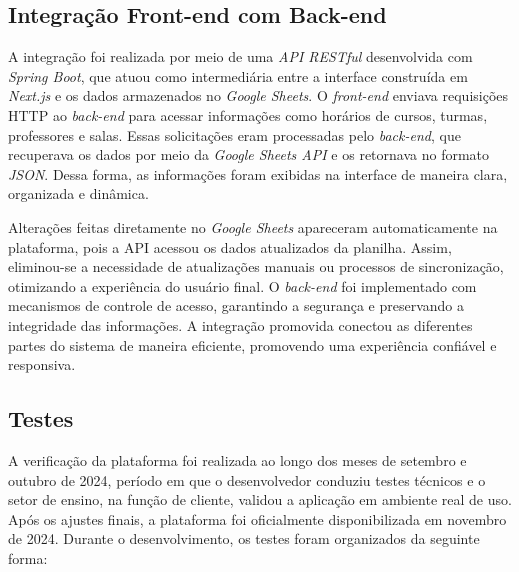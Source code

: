\subsection{Integração Front-end com Back-end}

A integração foi realizada por meio de uma \textit{API RESTful} desenvolvida com \textit{Spring Boot}, que atuou como intermediária entre a interface construída em \textit{Next.js} e os dados armazenados no \textit{Google Sheets}. O \textit{front-end} enviava requisições HTTP ao \textit{back-end} para acessar informações como horários de cursos, turmas, professores e salas. Essas solicitações eram processadas pelo \textit{back-end}, que recuperava os dados por meio da \textit{Google Sheets API} e os retornava no formato \textit{JSON}. Dessa forma, as informações foram exibidas na interface de maneira clara, organizada e dinâmica.

Alterações feitas diretamente no \textit{Google Sheets} apareceram automaticamente na plataforma, pois a API acessou os dados atualizados da planilha. Assim, eliminou-se a necessidade de atualizações manuais ou processos de sincronização, otimizando a experiência do usuário final. O \textit{back-end} foi implementado com mecanismos de controle de acesso, garantindo a segurança e preservando a integridade das informações. A integração promovida conectou as diferentes partes do sistema de maneira eficiente, promovendo uma experiência confiável e responsiva.

\subsection{Testes}

A verificação da plataforma foi realizada ao longo dos meses de setembro e outubro de 2024, período em que o desenvolvedor conduziu testes técnicos e o setor de ensino, na função de cliente, validou a aplicação em ambiente real de uso. Após os ajustes finais, a plataforma foi oficialmente disponibilizada em novembro de 2024. Durante o desenvolvimento, os testes foram organizados da seguinte forma:


